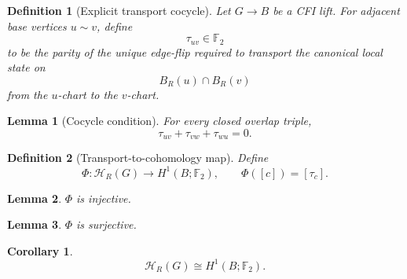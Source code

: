 \documentclass[11pt]{article}
\newtheorem{definition}{Definition}
\newtheorem{lemma}{Lemma}
\newtheorem{corollary}{Corollary}
\begin{document}
\begin{definition}[Explicit transport cocycle]
Let $G\to B$ be a CFI lift. For adjacent base vertices $u\sim v$, define
\[
\tau_{uv}\in\mathbb F_2
\]
to be the parity of the unique edge-flip required to transport the canonical local state on
\[
B_R(u)\cap B_R(v)
\]
from the $u$-chart to the $v$-chart.
\end{definition}

\begin{lemma}[Cocycle condition]
For every closed overlap triple,
\[
\tau_{uv}+\tau_{vw}+\tau_{wu}=0.
\]
\end{lemma}

\begin{definition}[Transport-to-cohomology map]
Define
\[
\Phi:\mathcal H_R(G)\to H^1(B;\mathbb F_2),
\qquad
\Phi([c])=[\tau_c].
\]
\end{definition}

\begin{lemma}
$\Phi$ is injective.
\end{lemma}

\begin{lemma}
$\Phi$ is surjective.
\end{lemma}

\begin{corollary}
\[
\mathcal H_R(G)\cong H^1(B;\mathbb F_2).
\]
\end{corollary}
\end{document}
